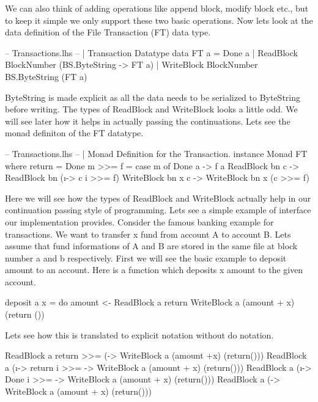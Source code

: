 \documentclass[11pt,a4paper]{article}
\begin{document}
We can also think of adding operations like append block, modify block
etc., but to keep it simple we only support these two basic operations.
Now lets look at the data definition of the File Transaction (FT) data
type.

\begin{code}[name=Transactions]
-- Transactions.lhs
-- | Transaction Datatype
data FT a = 
    Done a | 
    ReadBlock BlockNumber (BS.ByteString -> FT a) | 
    WriteBlock BlockNumber BS.ByteString (FT a)
\end{code}

ByteString is made explicit as all the data needs to be serialized to ByteString before writing.
The types of ReadBlock and WriteBlock looks a little odd. We will see later how it helps in actually passing the continuations.
Lets see the monad definiton of the FT datatype.

\begin{code}[name=Transactions]
-- Transactions.lhs
-- | Monad Definition for the Transaction. 
instance Monad FT where 
    return = Done 
    m >>= f = case m of 
        Done a -> f a 
        ReadBlock bn c -> ReadBlock bn (\i -> c i  >>= f) 
        WriteBlock bn x c -> WriteBlock bn x (c >>= f)
\end{code}

Here we will see how the types of ReadBlock and WriteBlock actually help
in our continuation passing style of programming. Lets see a simple
example of interface our implementation provides.
Consider the famous banking example for transactions. We want to
transfer x fund from account A to account B.
Lets assume that fund informations of A and B are stored in the same
file at block number a and b respectively.
First we will see the basic example to deposit amount to an account. 
Here is a function which deposits x amount to the given account. 

\begin{code}
deposit a x = do 
      amount <- ReadBlock a return 
      WriteBlock a (amount + x) (return ())
\end{code}

Lets see how this is translated to explicit notation without do
notation.

\begin{code}[stepnumber=2]
 ReadBlock a return >>= (\amount -> WriteBlock a 
   (amount +x) (return()))
 ReadBlock a (\i -> return i >>= 
   \amount -> WriteBlock a (amount + x) (return()))
 ReadBlock a (\i -> Done i  >>= 
   \amount -> WriteBlock a (amount + x) (return()))
 ReadBlock a (\amount -> 
   WriteBlock a (amount + x) (return()))
\end{code}
\end{document}
